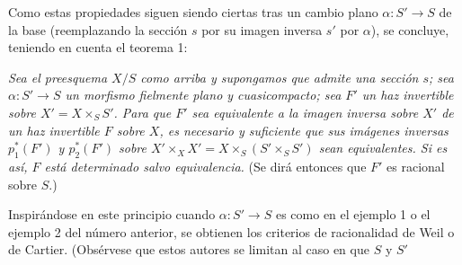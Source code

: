 \documentclass[11pt,twoside,openany]{book}
\numberwithin{equation}{section}
\theoremstyle{plain}
\theoremstyle{definition}
\theoremstyle{remark}
\theoremstyle{plain}
\theoremstyle{definition}
\theoremstyle{remark}
\begin{document}
Como estas propiedades siguen siendo ciertas tras un cambio plano
$\alpha:S'\longrightarrow S$ de la base (reemplazando la sección $s$ por su
imagen inversa $s'$ por $\alpha$), se concluye, teniendo en cuenta el teorema 1:

\emph{Sea el preesquema $X/S$ como arriba y supongamos que admite una sección
$s$; sea $\alpha:S'\longrightarrow S$ un morfismo fielmente plano y
cuasicompacto; sea $F'$ un haz invertible sobre $X'=X\times_SS'$. Para que $F'$
sea equivalente a la imagen inversa sobre $X'$ de un haz invertible $F$ sobre
$X$, es necesario y suficiente que sus imágenes inversas $p_1^*(F')$ y
$p_2^*(F')$ sobre $X'\times_XX'=X\times_S(S'\times_SS')$ sean equivalentes. Si
es así, $F$ está determinado salvo equivalencia.} (Se dirá entonces que $F'$
es racional sobre $S$.)

Inspirándose en este principio cuando $\alpha:S'\longrightarrow S$ es como en
el ejemplo 1 o el ejemplo 2 del número anterior, se obtienen los criterios de
racionalidad de Weil o de Cartier. (Obsérvese que estos autores se limitan al
caso en que $S$ y $S'$
\end{document}
